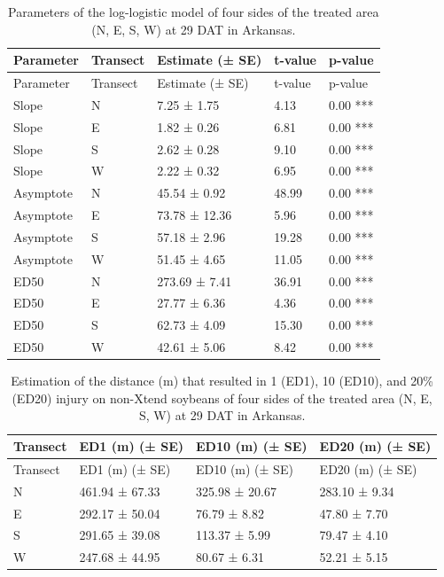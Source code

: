 \documentclass[]{article}
\begin{document}
\begin{longtable}[]{@{}lllll@{}}
\caption{Parameters of the log-logistic model of four sides of the
treated area (N, E, S, W) at 29 DAT in Arkansas.}\tabularnewline
\toprule
Parameter & Transect & Estimate (± SE) & t-value &
p-value\tabularnewline
\midrule
\endfirsthead
\toprule
Parameter & Transect & Estimate (± SE) & t-value &
p-value\tabularnewline
\midrule
\endhead
Slope & N & 7.25 ± 1.75 & 4.13 & 0.00 ***\tabularnewline
Slope & E & 1.82 ± 0.26 & 6.81 & 0.00 ***\tabularnewline
Slope & S & 2.62 ± 0.28 & 9.10 & 0.00 ***\tabularnewline
Slope & W & 2.22 ± 0.32 & 6.95 & 0.00 ***\tabularnewline
Asymptote & N & 45.54 ± 0.92 & 48.99 & 0.00 ***\tabularnewline
Asymptote & E & 73.78 ± 12.36 & 5.96 & 0.00 ***\tabularnewline
Asymptote & S & 57.18 ± 2.96 & 19.28 & 0.00 ***\tabularnewline
Asymptote & W & 51.45 ± 4.65 & 11.05 & 0.00 ***\tabularnewline
ED50 & N & 273.69 ± 7.41 & 36.91 & 0.00 ***\tabularnewline
ED50 & E & 27.77 ± 6.36 & 4.36 & 0.00 ***\tabularnewline
ED50 & S & 62.73 ± 4.09 & 15.30 & 0.00 ***\tabularnewline
ED50 & W & 42.61 ± 5.06 & 8.42 & 0.00 ***\tabularnewline
\bottomrule
\end{longtable}

\begin{longtable}[]{@{}llll@{}}
\caption{Estimation of the distance (m) that resulted in 1 (ED1), 10
(ED10), and 20\% (ED20) injury on non-Xtend soybeans of four sides of
the treated area (N, E, S, W) at 29 DAT in Arkansas.}\tabularnewline
\toprule
Transect & ED1 (m) (± SE) & ED10 (m) (± SE) & ED20 (m) (±
SE)\tabularnewline
\midrule
\endfirsthead
\toprule
Transect & ED1 (m) (± SE) & ED10 (m) (± SE) & ED20 (m) (±
SE)\tabularnewline
\midrule
\endhead
N & 461.94 ± 67.33 & 325.98 ± 20.67 & 283.10 ± 9.34\tabularnewline
E & 292.17 ± 50.04 & 76.79 ± 8.82 & 47.80 ± 7.70\tabularnewline
S & 291.65 ± 39.08 & 113.37 ± 5.99 & 79.47 ± 4.10\tabularnewline
W & 247.68 ± 44.95 & 80.67 ± 6.31 & 52.21 ± 5.15\tabularnewline
\bottomrule
\end{longtable}

\newpage
\end{document}
